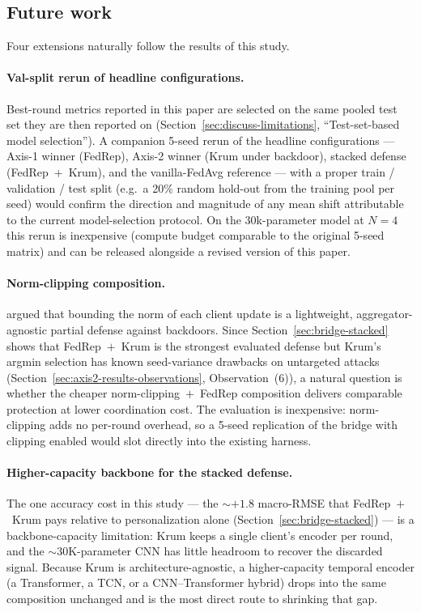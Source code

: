 \documentclass[a4paper,fleqn,doubleblind]{cas-sc}
\begin{document}
\subsection{Future work}
\label{sec:discuss-future}

Four extensions naturally follow the results of this study.

\paragraph{Val-split rerun of headline configurations.}
Best-round metrics reported in this paper are selected on the
same pooled test set they are then reported on
(Section~\ref{sec:discuss-limitations}, ``Test-set-based model
selection''). A companion 5-seed rerun of the headline
configurations --- Axis-1 winner (FedRep), Axis-2 winner (Krum
under backdoor), stacked defense (FedRep~$+$~Krum), and the
vanilla-FedAvg reference --- with a proper train / validation /
test split (e.g.\ a 20\% random hold-out from the training pool
per seed) would confirm the direction and magnitude of any mean
shift attributable to the current model-selection protocol. On
the 30k-parameter model at $N = 4$ this rerun is inexpensive
(compute budget comparable to the original 5-seed matrix) and
can be released alongside a revised version of this paper.

\paragraph{Norm-clipping composition.}
\citet{Sun2019CanYouBackdoor} argued that bounding the norm of each
client update is a lightweight, aggregator-agnostic partial defense
against backdoors. Since Section~\ref{sec:bridge-stacked} shows
that FedRep~$+$~Krum is the strongest evaluated defense but Krum's
argmin selection has known seed-variance drawbacks on untargeted
attacks (Section~\ref{sec:axis2-results-observations},
Observation~(6)), a natural question is whether the cheaper
norm-clipping~$+$~FedRep composition delivers comparable
protection at lower coordination cost. The evaluation is
inexpensive: norm-clipping adds no per-round overhead, so a 5-seed
replication of the bridge with clipping enabled would slot directly
into the existing harness.

\paragraph{Higher-capacity backbone for the stacked defense.}
The one accuracy cost in this study --- the $\sim +1.8$ macro-RMSE
that FedRep~$+$~Krum pays relative to personalization alone
(Section~\ref{sec:bridge-stacked}) --- is a backbone-capacity
limitation: Krum keeps a single client's encoder per round, and the
$\sim 30$K-parameter CNN has little headroom to recover the
discarded signal. Because Krum is architecture-agnostic, a
higher-capacity temporal encoder (a Transformer, a TCN, or a
CNN--Transformer hybrid) drops into the same composition unchanged
and is the most direct route to shrinking that gap.
\end{document}
